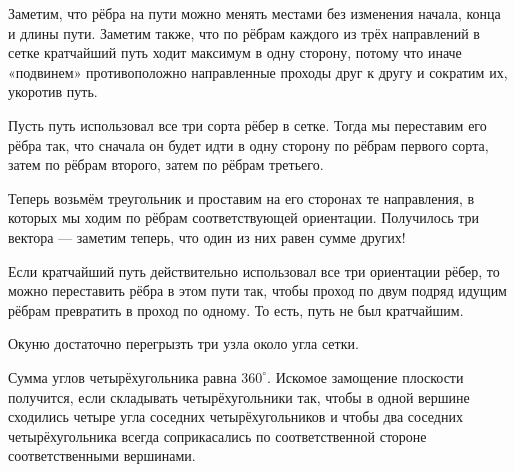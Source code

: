 \begin{itemize}

\itA Заметим, что рёбра на пути можно менять местами без изменения начала, конца и длины пути. Заметим также, что по рёбрам каждого из трёх направлений в сетке кратчайший путь ходит максимум в одну сторону, потому что иначе «подвинем» противоположно направленные проходы друг к другу и сократим их, укоротив путь.

Пусть путь использовал все три сорта рёбер в сетке. Тогда мы переставим его рёбра так, что сначала он будет идти в одну сторону по рёбрам первого сорта, затем по рёбрам второго, затем по рёбрам третьего.

Теперь возьмём треугольник и проставим на его сторонах те направления, в которых мы ходим по рёбрам соответствующей ориентации. Получилось три вектора — заметим теперь, что один из них равен сумме других!

Если кратчайший путь действительно использовал все три ориентации рёбер, то можно переставить рёбра в этом пути так, чтобы проход по двум подряд идущим рёбрам превратить в проход по одному. То есть, путь не был кратчайшим.

\itB Окуню достаточно перегрызть три узла около угла сетки.

\itC Сумма углов четырёхугольника равна $360^\circ$. Искомое замощение плоскости получится, если складывать четырёхугольники так, чтобы в одной вершине сходились четыре угла соседних четырёхугольников и чтобы два соседних четырёхугольника всегда соприкасались по соответственной стороне соответственными вершинами.
\end{itemize}